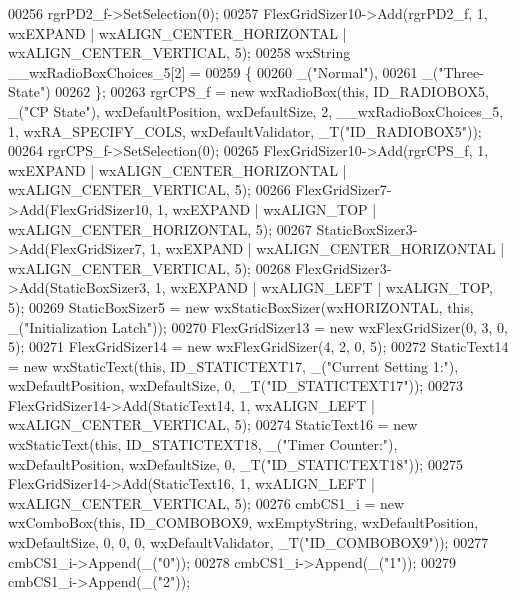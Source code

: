 \begin{DoxyCode}
00256     rgrPD2\_f->SetSelection(0);
00257     FlexGridSizer10->Add(rgrPD2\_f, 1, wxEXPAND | wxALIGN\_CENTER\_HORIZONTAL | wxALIGN\_CENTER\_VERTICAL, 5);
00258     wxString \_\_wxRadioBoxChoices\_5[2] =
00259     \{
00260         \_(\textcolor{stringliteral}{"Normal"}),
00261         \_(\textcolor{stringliteral}{"Three-State"})
00262     \};
00263     rgrCPS\_f = \textcolor{keyword}{new} wxRadioBox(\textcolor{keyword}{this}, ID\_RADIOBOX5, \_(\textcolor{stringliteral}{"CP State"}), wxDefaultPosition, wxDefaultSize, 2, 
      \_\_wxRadioBoxChoices\_5, 1, wxRA\_SPECIFY\_COLS, wxDefaultValidator, \_T(\textcolor{stringliteral}{"ID\_RADIOBOX5"}));
00264     rgrCPS\_f->SetSelection(0);
00265     FlexGridSizer10->Add(rgrCPS\_f, 1, wxEXPAND | wxALIGN\_CENTER\_HORIZONTAL | wxALIGN\_CENTER\_VERTICAL, 5);
00266     FlexGridSizer7->Add(FlexGridSizer10, 1, wxEXPAND | wxALIGN\_TOP | wxALIGN\_CENTER\_HORIZONTAL, 5);
00267     StaticBoxSizer3->Add(FlexGridSizer7, 1, wxEXPAND | wxALIGN\_CENTER\_HORIZONTAL | wxALIGN\_CENTER\_VERTICAL,
       5);
00268     FlexGridSizer3->Add(StaticBoxSizer3, 1, wxEXPAND | wxALIGN\_LEFT | wxALIGN\_TOP, 5);
00269     StaticBoxSizer5 = \textcolor{keyword}{new} wxStaticBoxSizer(wxHORIZONTAL, \textcolor{keyword}{this}, \_(\textcolor{stringliteral}{"Initialization Latch"}));
00270     FlexGridSizer13 = \textcolor{keyword}{new} wxFlexGridSizer(0, 3, 0, 5);
00271     FlexGridSizer14 = \textcolor{keyword}{new} wxFlexGridSizer(4, 2, 0, 5);
00272     StaticText14 = \textcolor{keyword}{new} wxStaticText(\textcolor{keyword}{this}, ID\_STATICTEXT17, \_(\textcolor{stringliteral}{"Current Setting 1:"}), wxDefaultPosition, 
      wxDefaultSize, 0, \_T(\textcolor{stringliteral}{"ID\_STATICTEXT17"}));
00273     FlexGridSizer14->Add(StaticText14, 1, wxALIGN\_LEFT | wxALIGN\_CENTER\_VERTICAL, 5);
00274     StaticText16 = \textcolor{keyword}{new} wxStaticText(\textcolor{keyword}{this}, ID\_STATICTEXT18, \_(\textcolor{stringliteral}{"Timer Counter:"}), wxDefaultPosition, 
      wxDefaultSize, 0, \_T(\textcolor{stringliteral}{"ID\_STATICTEXT18"}));
00275     FlexGridSizer14->Add(StaticText16, 1, wxALIGN\_LEFT | wxALIGN\_CENTER\_VERTICAL, 5);
00276     cmbCS1\_i = \textcolor{keyword}{new} wxComboBox(\textcolor{keyword}{this}, ID\_COMBOBOX9, wxEmptyString, wxDefaultPosition, wxDefaultSize, 0, 0, 0,
       wxDefaultValidator, \_T(\textcolor{stringliteral}{"ID\_COMBOBOX9"}));
00277     cmbCS1\_i->Append(\_(\textcolor{stringliteral}{"0"}));
00278     cmbCS1\_i->Append(\_(\textcolor{stringliteral}{"1"}));
00279     cmbCS1\_i->Append(\_(\textcolor{stringliteral}{"2"}));

\end{DoxyCode}
